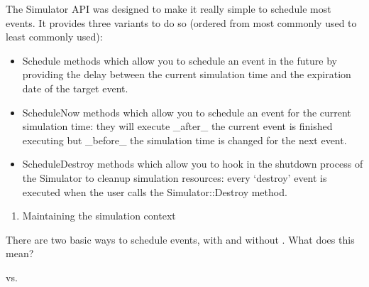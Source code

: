 \documentclass[letterpaper,10pt,english]{sphinxmanual}
\begin{document}
The Simulator API was designed to make it really simple to schedule most
events. It provides three variants to do so (ordered from most commonly
used to least commonly used):
\begin{itemize}
\item {} 
Schedule methods which allow you to schedule an event in the future
by providing the delay between the current simulation time and the
expiration date of the target event.

\item {} 
ScheduleNow methods which allow you to schedule an event for the
current simulation time: they will execute \_after\_ the current event is
finished executing but \_before\_ the simulation time is changed for the
next event.

\item {} 
ScheduleDestroy methods which allow you to hook in the shutdown
process of the Simulator to cleanup simulation resources: every
‘destroy’ event is executed when the user calls the Simulator::Destroy
method.

\end{itemize}
\begin{enumerate}
%
\setcounter{enumi}{2}
\item {} 
Maintaining the simulation context

\end{enumerate}

There are two basic ways to schedule events, with and without .
What does this mean?

\begin{sphinxVerbatim}[commandchars=\\\{\}]
       
\end{sphinxVerbatim}

vs.

\begin{sphinxVerbatim}[commandchars=\\\{\}]
         
\end{sphinxVerbatim}
\end{document}
